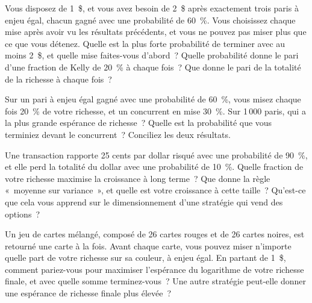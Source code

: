 \begin{question}\label{iq:iv2:betting-and-kelly:29}
Vous disposez de 1~\$, et vous avez besoin de 2~\$ après exactement trois paris à enjeu égal, chacun gagné avec une probabilité de 60~\%. Vous choisissez chaque mise après avoir vu les résultats précédents, et vous ne pouvez pas miser plus que ce que vous détenez. Quelle est la plus forte probabilité de terminer avec au moins 2~\$, et quelle mise faites-vous d'abord~? Quelle probabilité donne le pari d'une fraction de Kelly de 20~\% à chaque fois~? Que donne le pari de la totalité de la richesse à chaque fois~?
\end{question}

\begin{question}\label{iq:iv2:betting-and-kelly:30}
Sur un pari à enjeu égal gagné avec une probabilité de 60~\%, vous misez chaque fois 20~\% de votre richesse, et un concurrent en mise 30~\%. Sur 1\,000 paris, qui a la plus grande espérance de richesse~? Quelle est la probabilité que vous terminiez devant le concurrent~? Conciliez les deux résultats.
\end{question}

\begin{question}\label{iq:iv2:betting-and-kelly:31}
Une transaction rapporte 25 cents par dollar risqué avec une probabilité de 90~\%, et elle perd la totalité du dollar avec une probabilité de 10~\%. Quelle fraction de votre richesse maximise la croissance à long terme~? Que donne la règle «~moyenne sur variance~», et quelle est votre croissance à cette taille~? Qu'est-ce que cela vous apprend sur le dimensionnement d'une stratégie qui vend des options~?
\end{question}

\begin{question}\label{iq:iv2:betting-and-kelly:32}
Un jeu de cartes mélangé, composé de 26 cartes rouges et de 26 cartes noires, est retourné une carte à la fois. Avant chaque carte, vous pouvez miser n'importe quelle part de votre richesse sur sa couleur, à enjeu égal. En partant de 1~\$, comment pariez-vous pour maximiser l'espérance du logarithme de votre richesse finale, et avec quelle somme terminez-vous~? Une autre stratégie peut-elle donner une espérance de richesse finale plus élevée~?
\end{question}

